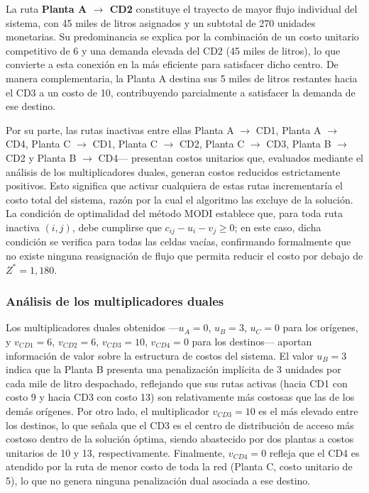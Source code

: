 \documentclass{article}
\begin{document}
La ruta \textbf{Planta A $\to$ CD2} constituye el trayecto de mayor flujo individual del sistema, con 45 miles de litros asignados y un subtotal de 270 unidades monetarias. Su predominancia se explica por la combinación de un costo unitario competitivo de 6 y una demanda elevada del CD2 (45 miles de litros), lo que convierte a esta conexión en la más eficiente para satisfacer dicho centro. De manera complementaria, la Planta A destina sus 5 miles de litros restantes hacia el CD3 a un costo de 10, contribuyendo parcialmente a satisfacer la demanda de ese destino.

Por su parte, las rutas inactivas entre ellas Planta A $\to$ CD1, Planta A $\to$ CD4, Planta C $\to$ CD1, Planta C $\to$ CD2, Planta C $\to$ CD3, Planta B $\to$ CD2 y Planta B $\to$ CD4— presentan costos unitarios que, evaluados mediante el análisis de los multiplicadores duales, generan costos reducidos estrictamente positivos. Esto significa que activar cualquiera de estas rutas incrementaría el costo total del sistema, razón por la cual el algoritmo las excluye de la solución. La condición de optimalidad del método MODI establece que, para toda ruta inactiva $(i,j)$, debe cumplirse que $c_{ij} - u_i - v_j \geq 0$; en este caso, dicha condición se verifica para todas las celdas vacías, confirmando formalmente que no existe ninguna reasignación de flujo que permita reducir el costo por debajo de $Z^* = 1{,}180$.

\subsubsection*{Análisis de los multiplicadores duales}

Los multiplicadores duales obtenidos —$u_A = 0$, $u_B = 3$, $u_C = 0$ para los orígenes, y $v_{CD1} = 6$, $v_{CD2} = 6$, $v_{CD3} = 10$, $v_{CD4} = 0$ para los destinos— aportan información de valor sobre la estructura de costos del sistema. El valor $u_B = 3$ indica que la Planta B presenta una penalización implícita de 3 unidades por cada mile de litro despachado, reflejando que sus rutas activas (hacia CD1 con costo 9 y hacia CD3 con costo 13) son relativamente más costosas que las de los demás orígenes. Por otro lado, el multiplicador $v_{CD3} = 10$ es el más elevado entre los destinos, lo que señala que el CD3 es el centro de distribución de acceso más costoso dentro de la solución óptima, siendo abastecido por dos plantas a costos unitarios de 10 y 13, respectivamente. Finalmente, $v_{CD4} = 0$ refleja que el CD4 es atendido por la ruta de menor costo de toda la red (Planta C, costo unitario de 5), lo que no genera ninguna penalización dual asociada a ese destino.
\end{document}

